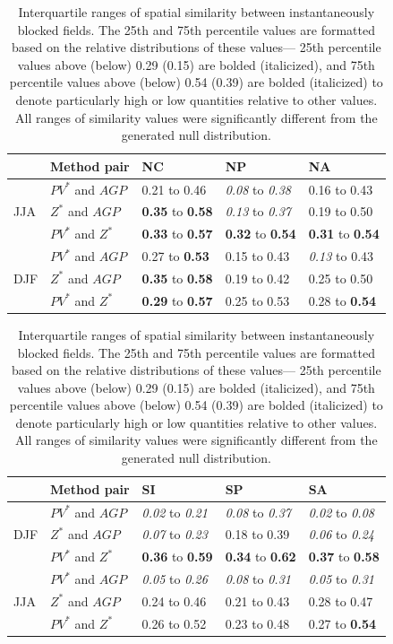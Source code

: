 \documentclass[smallextended]{svjour3}       %
\numberwithin{equation}{section}
\begin{document}
\begin{table}
\centering

\caption{ Interquartile ranges of spatial similarity between instantaneously blocked fields. The 25th and 75th percentile values are formatted based on the relative distributions of these values--- 25th percentile values above (below) 0.29 (0.15) are bolded (italicized), and 75th percentile values above (below) 0.54 (0.39) are bolded (italicized) to denote particularly high or low quantities relative to other values. All ranges of similarity values were significantly different from the generated null distribution.}
\label{simtabcol}
\begin{tabular}{|l|l|l|l|l|}
\hline
  & Method pair & NC    & NP    & NA    \\ \hline
\multirow{3}{*}{JJA} 
   & $PV^* $ and $AGP$    & {0.21} to {0.46} & \textit{0.08} to \textit{0.38} & {0.16} to {0.43}  \\  
   & $Z^*$ and $AGP$   & \textbf{0.35} to \textbf{0.58} & \textit{0.13} to \textit{0.37} & {0.19} to {0.50}  \\   
   & $PV^*$ and $Z^*$   & \textbf{0.33} to \textbf{0.57} & \textbf{0.32} to \textbf{0.54} & \textbf{0.31} to \textbf{0.54}  \\ 
   \hline
\multirow{3}{*}{DJF}
  & $PV^*$ and $AGP$ & {0.27} to \textbf{0.53} & {0.15} to {0.43} & \textit{0.13} to {0.43} \\   
  & $Z^*$ and $AGP$ & \textbf{0.35} to \textbf{0.58} & {0.19} to {0.42} & 0.25 to {0.50} \\ 
  & $PV^*$ and $Z^*$   & \textbf{0.29} to \textbf{0.57} & {0.25} to {0.53} & {0.28} to \textbf{0.54} \\  
  \hline
\end{tabular}
\begin{tabular}{|l|l|l|l|l|}
\hline
  & Method pair & SI    & SP    & SA      \\ \hline

\multirow{3}{*}{DJF}
  & $PV^*$ and $AGP$  & \textit{0.02} to \textit{0.21} & \textit{0.08} to \textit{0.37} & \textit{0.02} to \textit{0.08} \\   
  & $Z^*$ and $AGP$ & \textit{0.07} to \textit{0.23} & {0.18} to {0.39} & \textit{0.06} to \textit{0.24} \\ 
  & $PV^*$ and $Z^*$  & \textbf{0.36} to \textbf{0.59} & \textbf{0.34} to \textbf{0.62} & \textbf{0.37} to \textbf{0.58} \\  
  \hline
  \multirow{3}{*}{JJA} 
   & $PV^* $ and $AGP$    & \textit{0.05} to \textit{0.26} & \textit{0.08} to \textit{0.31} & \textit{0.05} to \textit{0.31} \\  
   & $Z^*$ and $AGP$   & {0.24} to {0.46} & {0.21} to {0.43} & {0.28} to {0.47} \\   
   & $PV^*$ and $Z^*$   & {0.26} to {0.52} & {0.23} to {0.48} & {0.27} to \textbf{0.54} \\ 
  \hline
\end{tabular}

\end{table}
\end{document}
